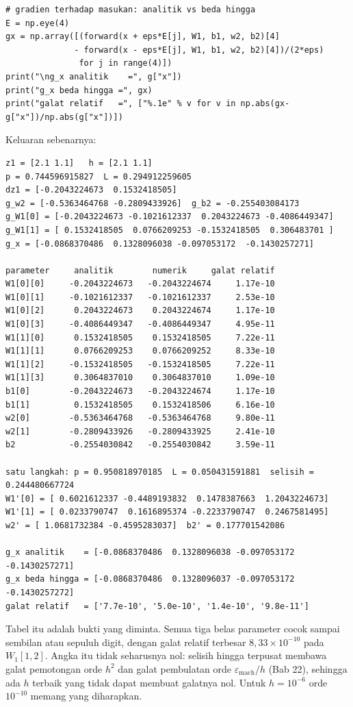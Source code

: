 \begin{lab}
\begin{verbatim}
# gradien terhadap masukan: analitik vs beda hingga
E = np.eye(4)
gx = np.array([(forward(x + eps*E[j], W1, b1, w2, b2)[4]
              - forward(x - eps*E[j], W1, b1, w2, b2)[4])/(2*eps)
               for j in range(4)])
print("\ng_x analitik    =", g["x"])
print("g_x beda hingga =", gx)
print("galat relatif   =", ["%.1e" % v for v in np.abs(gx-g["x"])/np.abs(g["x"])])
\end{verbatim}
Keluaran sebenarnya:
\begin{verbatim}
z1 = [2.1 1.1]   h = [2.1 1.1]
p = 0.744596915827  L = 0.294912259605
dz1 = [-0.2043224673  0.1532418505]
g_w2 = [-0.5363464768 -0.2809433926]  g_b2 = -0.255403084173
g_W1[0] = [-0.2043224673 -0.1021612337  0.2043224673 -0.4086449347]
g_W1[1] = [ 0.1532418505  0.0766209253 -0.1532418505  0.306483701 ]
g_x = [-0.0868370486  0.1328096038 -0.097053172  -0.1430257271]

parameter     analitik        numerik     galat relatif
W1[0][0]     -0.2043224673   -0.2043224674     1.17e-10
W1[0][1]     -0.1021612337   -0.1021612337     2.53e-10
W1[0][2]      0.2043224673    0.2043224674     1.17e-10
W1[0][3]     -0.4086449347   -0.4086449347     4.95e-11
W1[1][0]      0.1532418505    0.1532418505     7.22e-11
W1[1][1]      0.0766209253    0.0766209252     8.33e-10
W1[1][2]     -0.1532418505   -0.1532418505     7.22e-11
W1[1][3]      0.3064837010    0.3064837010     1.09e-10
b1[0]        -0.2043224673   -0.2043224674     1.17e-10
b1[1]         0.1532418505    0.1532418506     6.16e-10
w2[0]        -0.5363464768   -0.5363464768     9.80e-11
w2[1]        -0.2809433926   -0.2809433925     2.41e-10
b2           -0.2554030842   -0.2554030842     3.59e-11

satu langkah: p = 0.950818970185  L = 0.050431591881  selisih = 0.244480667724
W1'[0] = [ 0.6021612337 -0.4489193832  0.1478387663  1.2043224673]
W1'[1] = [ 0.0233790747  0.1616895374 -0.2233790747  0.2467581495]
w2' = [ 1.0681732384 -0.4595283037]  b2' = 0.177701542086

g_x analitik    = [-0.0868370486  0.1328096038 -0.097053172  -0.1430257271]
g_x beda hingga = [-0.0868370486  0.1328096037 -0.097053172  -0.1430257272]
galat relatif   = ['7.7e-10', '5.0e-10', '1.4e-10', '9.8e-11']
\end{verbatim}
\end{lab}

Tabel itu adalah bukti yang diminta. Semua tiga belas parameter cocok sampai sembilan atau sepuluh digit, dengan galat relatif terbesar $8{,}33\times10^{-10}$ pada $W_{1}[1,2]$. Angka itu tidak seharusnya nol: selisih hingga terpusat membawa galat pemotongan orde $h^{2}$ dan galat pembulatan orde $\varepsilon_{\mathrm{mach}}/h$ (Bab 22), sehingga ada $h$ terbaik yang tidak dapat membuat galatnya nol. Untuk $h=10^{-6}$ orde $10^{-10}$ memang yang diharapkan.
 

